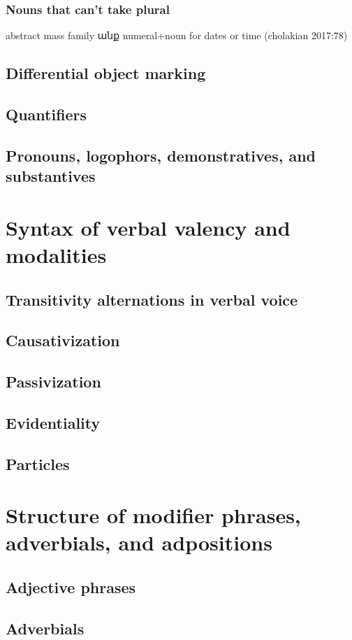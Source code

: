\section{Nouns that can't take plural}
abstract
mass
family անք
numeral+noun for dates or time (cholakian 2017:78)
\chapter{Differential object marking}
\chapter{Quantifiers}
\chapter{Pronouns, logophors, demonstratives, and substantives}
\part{Syntax of verbal valency and modalities}
\chapter{Transitivity alternations in verbal voice}
\chapter{Causativization}
\chapter{Passivization}
\chapter{Evidentiality}
\chapter{Particles}

\part{Structure of modifier phrases, adverbials, and adpositions}
\chapter{Adjective phrases}
\chapter{Adverbials}
